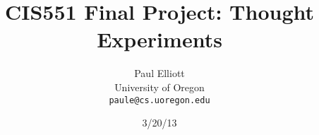 \documentclass[letterpaper,10pt,titlepage]{article}
\date{3/20/13}
\begin{document}
\setcounter{page}{1}
\pagestyle{plain}


\title{CIS551 Final Project: Thought Experiments}
\author{
{Paul Elliott}\\
University of Oregon\\
\texttt{paule@cs.uoregon.edu}
}

\maketitle
\tableofcontents









\end{document}
